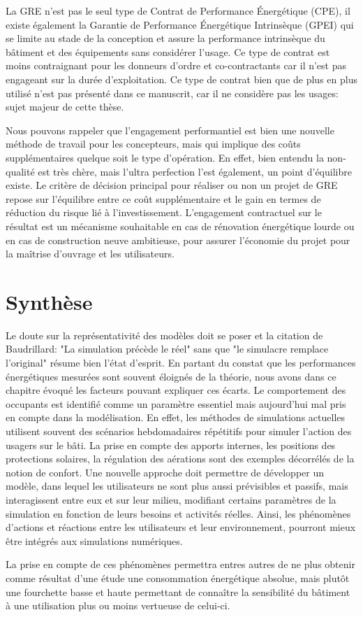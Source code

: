 La GRE n'est pas le seul type de Contrat de Performance Énergétique (CPE), il existe également la Garantie de Performance Énergétique Intrinsèque (GPEI) qui se limite au stade de la conception et assure la performance intrinsèque du bâtiment et des équipements sans considérer l'usage. Ce type de contrat est moins contraignant pour les donneurs d'ordre et co-contractants car il n'est pas engageant sur la durée d'exploitation. Ce type de contrat bien que de plus en plus utilisé n'est pas présenté dans ce manuscrit, car il ne considère pas les usages: sujet majeur de cette thèse.

Nous pouvons rappeler que l'engagement performantiel est bien une nouvelle méthode de travail pour les concepteurs, mais qui implique des coûts supplémentaires quelque soit le type d'opération. En effet, bien entendu la non-qualité est très chère, mais l'ultra perfection l'est également, un point d'équilibre existe. Le critère de décision principal pour réaliser ou non un projet de GRE repose sur l'équilibre entre ce coût supplémentaire et le gain en termes de réduction du risque lié à l'investissement. L'engagement contractuel sur le résultat est un mécanisme souhaitable en cas de rénovation énergétique lourde ou en cas de construction neuve ambitieuse, pour assurer l'économie du projet pour la maîtrise d'ouvrage et les utilisateurs. 

\section{Synthèse}

Le doute sur la représentativité des modèles doit se poser et la citation de Baudrillard: "La simulation précède le réel" sans que "le simulacre remplace l'original" résume bien l'état d'esprit. En partant du constat que les performances énergétiques mesurées sont souvent éloignés de la théorie, nous avons dans ce chapitre évoqué les facteurs pouvant expliquer ces écarts. Le comportement des occupants est identifié comme un paramètre essentiel mais aujourd'hui mal pris en compte dans la modélisation. En effet, les méthodes de simulations actuelles utilisent souvent des scénarios hebdomadaires répétitifs pour simuler l'action des usagers sur le bâti. La prise en compte des apports internes, les positions des protections solaires, la régulation des aérations sont des exemples décorrélés de la notion de confort. Une nouvelle approche doit permettre de développer un modèle, dans lequel les utilisateurs ne sont plus aussi prévisibles et passifs, mais interagissent entre eux et sur leur milieu, modifiant certains paramètres de la simulation en fonction de leurs besoins et activités réelles. Ainsi, les phénomènes d'actions et réactions entre les utilisateurs et leur environnement, pourront mieux être intégrés aux simulations numériques.

La prise en compte de ces phénomènes permettra entres autres de ne plus obtenir comme résultat d'une étude une consommation énergétique absolue, mais plutôt une fourchette basse et haute permettant de connaître la sensibilité du bâtiment à une utilisation plus ou moins vertueuse de celui-ci.
